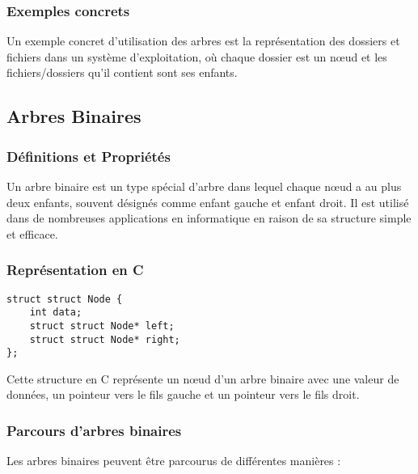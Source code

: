 \subsubsection{Exemples concrets}
Un exemple concret d'utilisation des arbres est la représentation des dossiers et fichiers dans un système d'exploitation, où chaque dossier est un nœud et les fichiers/dossiers qu'il contient sont ses enfants.

\subsection{Arbres Binaires}\label{subsec:arbres-binaires}

\subsubsection{Définitions et Propriétés}
Un arbre binaire est un type spécial d'arbre dans lequel chaque nœud a au plus deux enfants, souvent désignés comme enfant gauche et enfant droit.
Il est utilisé dans de nombreuses applications en informatique en raison de sa structure simple et efficace.

\subsubsection{Représentation en C}
\begin{lstlisting}[label={lst:imp_BT}]
struct struct Node {
    int data;
    struct struct Node* left;
    struct struct Node* right;
};
\end{lstlisting}
Cette structure en C représente un nœud d'un arbre binaire avec une valeur de données, un pointeur vers le fils gauche et un pointeur vers le fils droit.

    \subsubsection{Parcours d'arbres binaires}
Les arbres binaires peuvent être parcourus de différentes manières :

